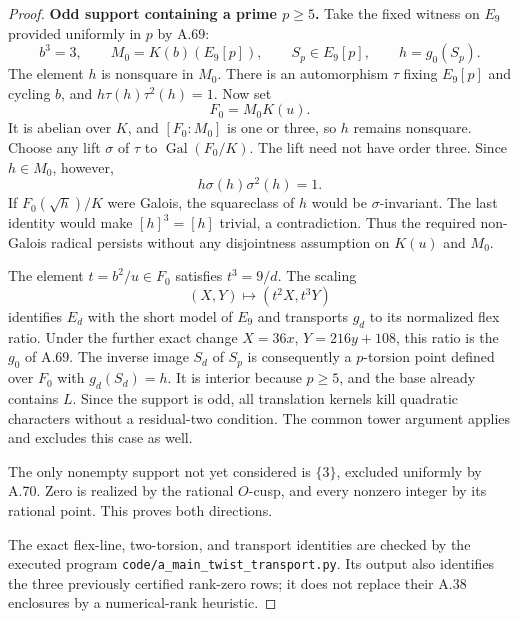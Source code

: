 \begin{proof}
\par\smallskip\noindent\textbf{Odd support containing a prime $p\ge5$.}\enspace
Take the fixed witness on $E_9$
provided uniformly in $p$ by A.69:
\[
 b^3=3,\qquad M_0=K(b)(E_9[p]),
 \qquad S_p\in E_9[p],\qquad h=g_0(S_p).
\]
The element $h$ is nonsquare in
$M_0$. There is an automorphism
$\tau$ fixing $E_9[p]$ and
cycling $b$, and
$h\tau(h)\tau^2(h)=1$.
Now set
\[
 F_0=M_0K(u).
 \tag{A71.3}
\]
It is abelian over $K$, and
$[F_0:M_0]$ is one or three,
so $h$ remains nonsquare.
Choose any lift $\sigma$ of
$\tau$ to $\operatorname{Gal}(F_0/K)$.
The lift need not have order
three. Since $h\in M_0$, however,
\[
 h\sigma(h)\sigma^2(h)=1.
\]
If $F_0(\sqrt h)/K$ were Galois,
the squareclass of $h$ would be
$\sigma$-invariant. The last
identity would make $[h]^3=[h]$
trivial, a contradiction. Thus
the required non-Galois radical
persists without any disjointness
assumption on $K(u)$ and $M_0$.

The element $t=b^2/u\in F_0$
satisfies $t^3=9/d$. The scaling
\[
 (X,Y)\longmapsto(t^2X,t^3Y)
\]
identifies $E_d$ with the short
model of $E_9$ and transports
$g_d$ to its normalized flex
ratio. Under the further exact
change $X=36x$, $Y=216y+108$,
this ratio is the $g_0$ of A.69.
The inverse image $S_d$ of $S_p$
is consequently a $p$-torsion
point defined over $F_0$ with
$g_d(S_d)=h$. It is interior
because $p\ge5$, and the base
already contains $L$.
Since the support is odd,
all translation kernels kill
quadratic characters without a
residual-two condition. The
common tower argument applies
and excludes this case as well.

The only nonempty support not
yet considered is $\{3\}$,
excluded uniformly by A.70.
Zero is realized by the
rational $O$-cusp, and every
nonzero integer by its rational
point. This proves both directions.

The exact flex-line, two-torsion,
and transport identities are
checked by the executed program
\texttt{code/a\_main\_twist\_transport.py}.
Its output also identifies the
three previously certified
rank-zero rows; it does not
replace their A.38 enclosures
by a numerical-rank heuristic.
\end{proof}

